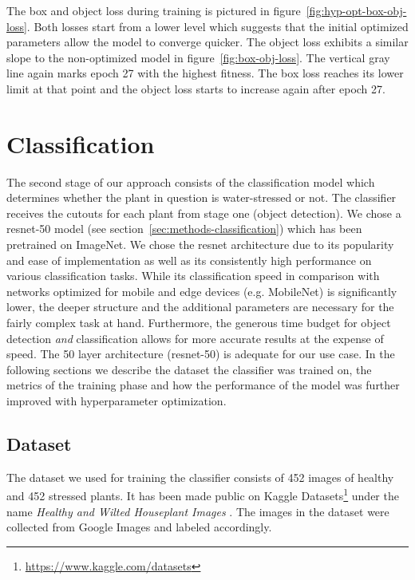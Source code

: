 \documentclass[final]{vutinfth} %
\begin{document}
The box and object loss during training is pictured in
figure~\ref{fig:hyp-opt-box-obj-loss}. Both losses start from a lower
level which suggests that the initial optimized parameters allow the
model to converge quicker. The object loss exhibits a similar slope to
the non-optimized model in figure~\ref{fig:box-obj-loss}. The vertical
gray line again marks epoch \num{27} with the highest fitness. The box
loss reaches its lower limit at that point and the object loss starts
to increase again after epoch \num{27}.

\section{Classification}
\label{sec:development-classification}

The second stage of our approach consists of the classification model
which determines whether the plant in question is water-stressed or
not. The classifier receives the cutouts for each plant from stage one
(object detection). We chose a \gls{resnet}-50 model (see
section~\ref{sec:methods-classification}) which has been pretrained on
ImageNet. We chose the \gls{resnet} architecture due to its popularity
and ease of implementation as well as its consistently high
performance on various classification tasks. While its classification
speed in comparison with networks optimized for mobile and edge
devices (e.g. MobileNet) is significantly lower, the deeper structure
and the additional parameters are necessary for the fairly complex
task at hand. Furthermore, the generous time budget for object
detection \emph{and} classification allows for more accurate results
at the expense of speed. The \num{50} layer architecture
(\gls{resnet}-50) is adequate for our use case. In the following
sections we describe the dataset the classifier was trained on, the
metrics of the training phase and how the performance of the model was
further improved with hyperparameter optimization.

\subsection{Dataset}
\label{ssec:class-train-dataset}

The dataset we used for training the classifier consists of \num{452}
images of healthy and \num{452} stressed plants. It has been made
public on Kaggle
Datasets\footnote{\url{https://www.kaggle.com/datasets}} under the
name \emph{Healthy and Wilted Houseplant Images} \cite{chan2020}. The
images in the dataset were collected from Google Images and labeled
accordingly.
\end{document}
